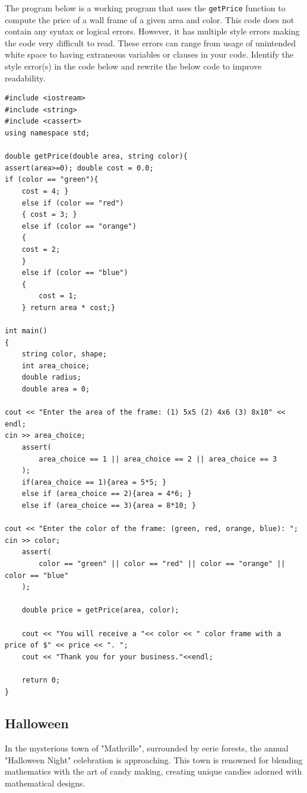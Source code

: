 \begin{multipart}
The program below is a working program that uses the \texttt{getPrice} function to compute the price of a wall frame of a given area and color. This code does not contain any syntax or logical errors. However, it has multiple style errors making the code very difficult to read. These errors can range from usage of unintended white space to having extraneous variables or clauses in your code. Identify the style error(s) in the code below and rewrite the below code to improve readability.


\end{multipart}

\begin{verbatim}
#include <iostream>
#include <string>
#include <cassert>
using namespace std;

double getPrice(double area, string color){
assert(area>=0); double cost = 0.0;
if (color == "green"){
    cost = 4; }
    else if (color == "red")
    { cost = 3; } 
    else if (color == "orange")
    {
    cost = 2;
    }
    else if (color == "blue")
    {
        cost = 1;
    } return area * cost;}

int main()
{
    string color, shape;
    int area_choice;
    double radius;
    double area = 0;

cout << "Enter the area of the frame: (1) 5x5 (2) 4x6 (3) 8x10" << endl;
cin >> area_choice;
    assert(
        area_choice == 1 || area_choice == 2 || area_choice == 3
    );
    if(area_choice == 1){area = 5*5; }
    else if (area_choice == 2){area = 4*6; }
    else if (area_choice == 3){area = 8*10; }

cout << "Enter the color of the frame: (green, red, orange, blue): ";
cin >> color;
    assert(
        color == "green" || color == "red" || color == "orange" || color == "blue"
    );

    double price = getPrice(area, color);

    cout << "You will receive a "<< color << " color frame with a price of $" << price << ". ";
    cout << "Thank you for your business."<<endl;

    return 0;
}
\end{verbatim}

\subsection{Halloween} %

In the mysterious town of "Mathville", surrounded by eerie forests, the annual "Halloween Night" celebration is approaching. This town is renowned for blending mathematics with the art of candy making, creating unique candies adorned with mathematical designs.

